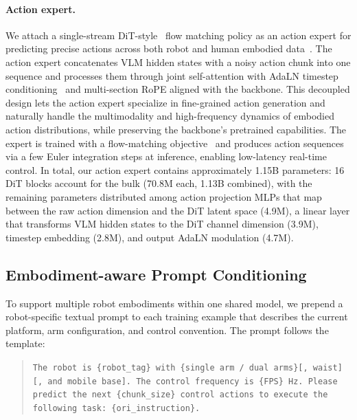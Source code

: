 \documentclass{llmxive}
\begin{document}
\paragraph{Action expert.}
We attach a single-stream DiT-style~\citep{esser2024scaling} flow matching policy as an action expert for predicting precise actions across both robot and human embodied data~\citep{janner2022planning,chi2023diffusion,adaptdiffuser,black2024pi0}.
The action expert concatenates VLM hidden states with a noisy action chunk into one sequence and processes them through joint self-attention with AdaLN timestep
conditioning~\citep{peebles2023scalable} and multi-section RoPE aligned with the backbone.
This decoupled design lets the action expert specialize in fine-grained action generation and naturally handle the multimodality and high-frequency dynamics of
embodied action distributions, while preserving the backbone's pretrained capabilities.
The expert is trained with a flow-matching objective~\citep{lipman2023flow} and produces action sequences via a few Euler integration steps at inference,
enabling low-latency real-time control.
In total, our action expert contains approximately 1.15B parameters: 16 DiT blocks account for the bulk (70.8M each, 1.13B combined), with the remaining parameters distributed among action projection MLPs that
map between the raw action dimension and the DiT latent space (4.9M), a linear layer that transforms VLM hidden states to the DiT channel dimension (3.9M), timestep embedding (2.8M), and output AdaLN modulation
(4.7M).



\subsection{Embodiment-aware Prompt Conditioning}
\label{sec:Prompt-formulation}
\label{sec:embodiment}

To support multiple robot embodiments within one shared model, we prepend a
robot-specific textual prompt to each training example that describes the
current platform, arm configuration, and control convention.
The prompt follows the template:

\begin{quote}
\texttt{The robot is \{robot\_tag\} with \{single arm / dual arms\}[, waist][, and mobile base].
The control frequency is \{FPS\} Hz.
Please predict the next \{chunk\_size\} control actions to execute the following task: \{ori\_instruction\}.}
\end{quote}
\end{document}
